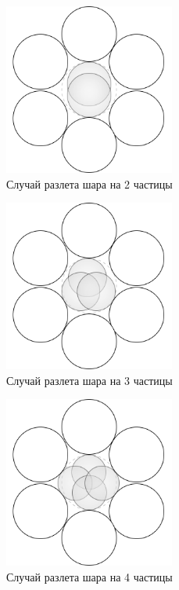\documentclass[utf8x, 14pt, oneside, a4paper]{article}
\begin{document}
\begin{figure}[H]
	\centering
	\includegraphics[width=0.5\textwidth]{2_balls} 
	\caption{Случай разлета шара на 2 частицы}
	\label{pic:2_balls}
\end{figure} 

\begin{figure}[H]
	\centering
	\includegraphics[width=0.5\textwidth]{3_balls} 
	\caption{Случай разлета шара на 3 частицы}
	\label{pic:3_balls}
\end{figure} 

\begin{figure}[H]
	\centering
	\includegraphics[width=0.5\textwidth]{4_balls} 
	\caption{Случай разлета шара на 4 частицы}
	\label{pic:4_balls}
\end{figure} 
\end{document}
